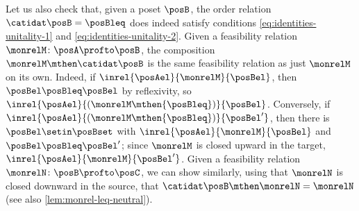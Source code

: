 \begin{example}
    Let us also check that, given a poset $\posB$, the order relation $\catidat\posB = {\posBleq}$ does indeed satisfy conditions \cref{eq:identities-unitality-1} and \cref{eq:identities-unitality-2}.
    Given a feasibility relation $\monrelM \colon \posA \profto \posB$, the composition $\monrelM \mthen \catidat\posB$ is the same feasibility relation as just $\monrelM$ on its own.
    Indeed, if $\inrel{\posAel}{\monrelM}{\posBel}$, then $\posBel \posBleq \posBel$ by reflexivity, so $\inrel{\posAel}{(\monrelM \mthen {\posBleq})}{\posBel}$.
    Conversely, if $\inrel{\posAel}{(\monrelM \mthen {\posBleq})}{\posBel'}$, then there is $\posBel \setin \posBset$ with $\inrel{\posAel}{\monrelM}{\posBel}$ and $\posBel \posBleq \posBel'$; since $\monrelM$ is closed upward in the target, $\inrel{\posAel}{\monrelM}{\posBel'}$.
    Given a feasibility relation $\monrelN \colon \posB \profto \posC$, we can show similarly, using that $\monrelN$ is closed downward in the source, that $\catidat\posB \mthen \monrelN = \monrelN$ (see also \cref{lem:monrel-leq-neutral}).
\end{example}



    







